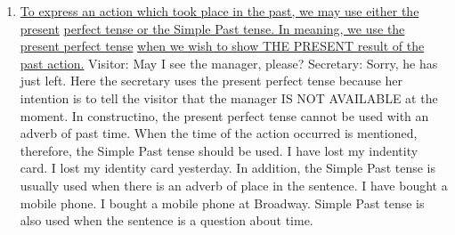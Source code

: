 \begin{enumerate}
    \item \underline{To express an action which took place in the past, we may
        use either the present}
        \newline
        \underline{perfect tense or the Simple Past tense. In meaning, we use
        the present perfect tense}
        \newline
        \underline{when we wish to show THE PRESENT result of the past action.}
        \newline
        \newline
        Visitor: May I see the manager, please?
        \newline
        \newline
        Secretary: Sorry, he has just left.
        \newline
        \newline
        Here the secretary uses the present perfect tense because her intention
        is to tell the visitor that the manager IS NOT AVAILABLE at the moment.
        \newline
        \newline
        In constructino, the present perfect tense cannot be used with an adverb
        of past time.
        When the time of the action occurred is mentioned, therefore, the Simple
        Past tense should be used.
        \newline
        \newline
        I have lost my indentity card.
        \newline
        \newline
        I lost my identity card yesterday.
        \newline
        \newline
        In addition, the Simple Past tense is usually used when there is an
        adverb of place in the sentence.
        \newline
        \newline
        I have bought a mobile phone.
        \newline
        \newline
        I bought a mobile phone at Broadway.
        \newline
        \newline
        Simple Past tense is also used when the sentence is a question about
        time.
        \newline
        \newline

\end{enumerate}
